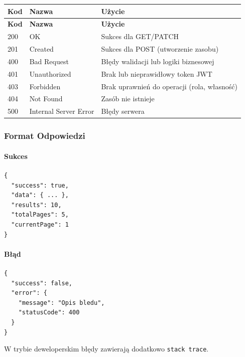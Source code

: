 \begin{longtable}{|p{2cm}|p{4cm}|p{8cm}|}
  \hline
  \textbf{Kod} & \textbf{Nazwa}        & \textbf{Użycie}                             \\ \hline
  \endfirsthead
  \hline
  \textbf{Kod} & \textbf{Nazwa}        & \textbf{Użycie}                             \\ \hline
  \endhead

  200          & OK                    & Sukces dla GET/PATCH                        \\ \hline
  201          & Created               & Sukces dla POST (utworzenie zasobu)         \\ \hline
  400          & Bad Request           & Błędy walidacji lub logiki biznesowej       \\ \hline
  401          & Unauthorized          & Brak lub nieprawidłowy token JWT            \\ \hline
  403          & Forbidden             & Brak uprawnień do operacji (rola, własność) \\ \hline
  404          & Not Found             & Zasób nie istnieje                          \\ \hline
  500          & Internal Server Error & Błędy serwera                               \\ \hline
\end{longtable}

\subsubsection{Format Odpowiedzi}

\paragraph{Sukces}
\begin{lstlisting}
{
  "success": true,
  "data": { ... },
  "results": 10,
  "totalPages": 5,
  "currentPage": 1
}
\end{lstlisting}

\paragraph{Błąd}
\begin{lstlisting}
{
  "success": false,
  "error": {
    "message": "Opis bledu",
    "statusCode": 400
  }
}
\end{lstlisting}

W trybie deweloperskim błędy zawierają dodatkowo \texttt{stack trace}.

